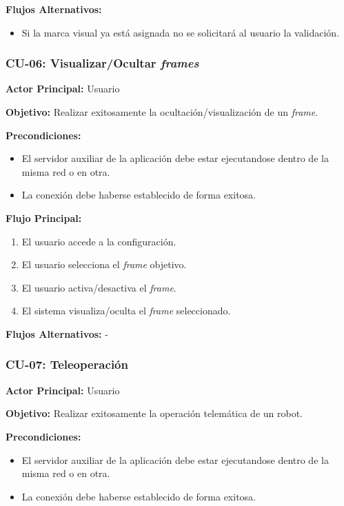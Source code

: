 \textbf{Flujos Alternativos:}
\begin{itemize}
    \item Si la marca visual ya está asignada no se solicitará al usuario la validación.
\end{itemize}

\subsubsection{CU-06: Visualizar/Ocultar \textit{frames}}

\textbf{Actor Principal:} Usuario

\textbf{Objetivo:}
Realizar exitosamente la ocultación/visualización de un \textit{frame}.

\textbf{Precondiciones:}
\begin{itemize}
    \item El servidor auxiliar de la aplicación debe estar ejecutandose dentro de la misma red o en otra. 
    \item La conexión debe haberse establecido de forma exitosa.
\end{itemize}

\textbf{Flujo Principal:}
\begin{enumerate}
    \item El usuario accede a la configuración.
    \item El usuario selecciona el \textit{frame} objetivo.
    \item El usuario activa/desactiva el \textit{frame}.
    \item El sistema visualiza/oculta el \textit{frame} seleccionado.
\end{enumerate}

\textbf{Flujos Alternativos:}
-

\subsubsection{CU-07: Teleoperación}

\textbf{Actor Principal:} Usuario

\textbf{Objetivo:}
Realizar exitosamente la operación telemática de un robot.

\textbf{Precondiciones:}
\begin{itemize}
    \item El servidor auxiliar de la aplicación debe estar ejecutandose dentro de la misma red o en otra. 
    \item La conexión debe haberse establecido de forma exitosa.
\end{itemize}

